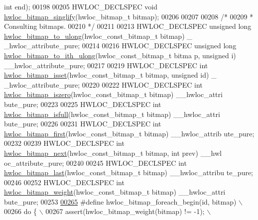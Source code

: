 \begin{DoxyCode}
       \textcolor{keywordtype}{int} end);
00198 
00205 HWLOC\_DECLSPEC \textcolor{keywordtype}{void} \hyperlink{a00065_ga4630aa1b7e08eac5b41be126194e84a1}{hwloc_bitmap_singlify}(hwloc\_bitmap\_t bitmap);
00206 
00207 
00208 \textcolor{comment}{/*}
00209 \textcolor{comment}{ * Consulting bitmaps.}
00210 \textcolor{comment}{ */}
00211 
00213 HWLOC\_DECLSPEC \textcolor{keywordtype}{unsigned} \textcolor{keywordtype}{long} \hyperlink{a00065_ga4fee4e3cea99e4a389c54a6c3f0c78ed}{hwloc_bitmap_to_ulong}(hwloc\_const\_bitmap\_t bitmap) \_
      \_hwloc\_attribute\_pure;
00214 
00216 HWLOC\_DECLSPEC \textcolor{keywordtype}{unsigned} \textcolor{keywordtype}{long} \hyperlink{a00065_gabc0b9f4cae56a1303c38b2380086efc2}{hwloc_bitmap_to_ith_ulong}(hwloc\_const\_bitmap\_t bitma
      p, \textcolor{keywordtype}{unsigned} i) \_\_hwloc\_attribute\_pure;
00217 
00219 HWLOC\_DECLSPEC \textcolor{keywordtype}{int} \hyperlink{a00065_ga2583f44cbdb5fff2ea40efdcf3975d3f}{hwloc_bitmap_isset}(hwloc\_const\_bitmap\_t bitmap, \textcolor{keywordtype}{unsigned} \textcolor{keywordtype}{id}) \_
      \_hwloc\_attribute\_pure;
00220 
00222 HWLOC\_DECLSPEC \textcolor{keywordtype}{int} \hyperlink{a00065_gaa94fed35d2a598bc4a8657b6955b7bf5}{hwloc_bitmap_iszero}(hwloc\_const\_bitmap\_t bitmap) \_\_hwloc\_attri
      bute\_pure;
00223 
00225 HWLOC\_DECLSPEC \textcolor{keywordtype}{int} \hyperlink{a00065_ga59a07ecd8e74f2d4ee4271a1dbf0e4dd}{hwloc_bitmap_isfull}(hwloc\_const\_bitmap\_t bitmap) \_\_hwloc\_attri
      bute\_pure;
00226 
00231 HWLOC\_DECLSPEC \textcolor{keywordtype}{int} \hyperlink{a00065_ga42472a7b75ca79cae19f0611fdb849e6}{hwloc_bitmap_first}(hwloc\_const\_bitmap\_t bitmap) \_\_hwloc\_attrib
      ute\_pure;
00232 
00239 HWLOC\_DECLSPEC \textcolor{keywordtype}{int} \hyperlink{a00065_ga00fc0b9d7d603e271b75956a7dd28826}{hwloc_bitmap_next}(hwloc\_const\_bitmap\_t bitmap, \textcolor{keywordtype}{int} prev) \_\_hwl
      oc\_attribute\_pure;
00240 
00245 HWLOC\_DECLSPEC \textcolor{keywordtype}{int} \hyperlink{a00065_ga4d5786ea9561d9ddbf90bc0ce606c549}{hwloc_bitmap_last}(hwloc\_const\_bitmap\_t bitmap) \_\_hwloc\_attribu
      te\_pure;
00246 
00252 HWLOC\_DECLSPEC \textcolor{keywordtype}{int} \hyperlink{a00065_ga12d520387be74f849f191d7a06ac325c}{hwloc_bitmap_weight}(hwloc\_const\_bitmap\_t bitmap) \_\_hwloc\_attri
      bute\_pure;
00253 
\hypertarget{a00027_source_l00265}{}\hyperlink{a00065_ga3f6861045a8029ade373510ffa727d2a}{00265} \textcolor{preprocessor}{#define hwloc\_bitmap\_foreach\_begin(id, bitmap) \(\backslash\)}
00266 \textcolor{preprocessor}{do \{ \(\backslash\)}
00267 \textcolor{preprocessor}{        assert(hwloc\_bitmap\_weight(bitmap) != -1); \(\backslash\)}

\end{DoxyCode}
